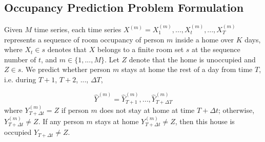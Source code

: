 
\subsection{Occupancy Prediction Problem Formulation}
Given $M$ time series, 
each time series $X^{(m)}=X^{(m)}_1, ..., X^{(m)}_t, ..., X_T^{(m)}$ 
represents a sequence of room occupancy of person $m$ inside 
a home over $K$ days, 
where $X_t\in s$ denotes that $X$ belongs to a finite room set $s$ at the sequence number of $t$, 
and $m\in\{1,...,M\}$. 
Let $Z$ denote that the home is unoccupied and $Z\in s$.  %
We predict whether person $m$ stays at home the rest of a day from time $T$,  i.e. during $T+1$, $T+2$, ..., $\Delta T$, 
 
\begin{equation}
\hat{Y}^{(m)}=\hat{Y}_{T+1}^{(m)},...,\hat{Y}^{(m)}_{T+\Delta T}
\end{equation}
where $Y_{T+\Delta t }^{(m)}=Z$ if person $m$ does not stay at home at time $T+\Delta t $;
otherwise, $Y_{T+\Delta t}^{(m)} \neq Z$. 
If any person $m$ stays at home $Y_{T+\Delta t}^{(m)} \neq Z$, then this house is occupied $Y_{T+ \Delta t} \neq Z$. 


